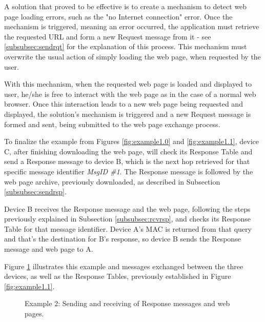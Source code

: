 A solution that proved to be effective is to create a mechanism to detect web page loading errors, such as the "no Internet connection" error. Once the mechanism is triggered, meaning an error occurred, the application must retrieve the requested \gls{URL} and form a new Request message from it - see \ref{subsubsec:sendrqt} for the explanation of this process. This mechanism must overwrite the usual action of simply loading the web page, when requested by the user.

With this mechanism, when the requested web page is loaded and displayed to user, he/she is free to interact with the web page as in the case of a normal web browser. Once this interaction leads to a new web page being requested and displayed, the solution's mechanism is triggered and a new Request message is formed and sent, being submitted to the web page exchange process.

To finalize the example from Figures \ref{fig:example1.0} and \ref{fig:example1.1}, device C, after finishing downloading the web page, will check its Response Table and send a Response message to device B, which is the next hop retrieved for that specific message identifier \textit{MsgID \#1}. The Response message is followed by the web page archive, previously downloaded, as described in Subsection \ref{subsubsec:sendrsp}.

Device B receives the Response message and the web page, following the steps previously explained in Subsection \ref{subsubsec:rcvrsp}, and checks its Response Table for that message identifier. Device A's \gls{MAC} is returned from that query and that's the destination for B's response, so device B sends the Response message and web page to A.

Figure \ref{fig:example1.2} illustrates this example and messages exchanged between the three devices, as well as the Response Tables, previously established in Figure \ref{fig:example1.1}.

\begin{figure}[ht]
   \noindent{}
	\caption{\label{fig:example1.2} Example 2: Sending and receiving of Response messages and web pages.}
\end{figure}









